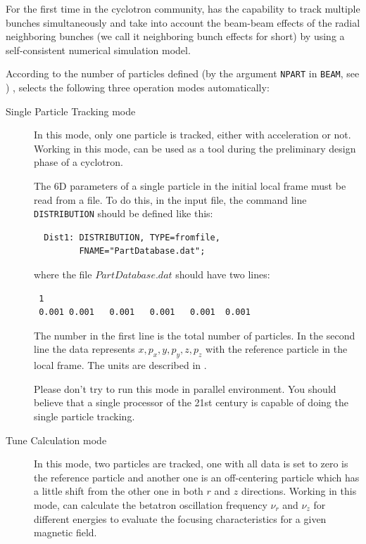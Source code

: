 For the first time in the cyclotron community, \opalcycl has the capability to track multiple bunches simultaneously
and take into account the beam-beam effects of the radial neighboring bunches (we call it neighboring bunch effects for short)
by using a self-consistent numerical simulation model.

According to the number of particles defined (by the argument \texttt{NPART} in \texttt{BEAM}, see ) ,
\opalcycl selects the following three operation modes automatically:

\begin{description}

\item[Single Particle Tracking mode]

  In this mode, only one particle is tracked, either with acceleration or not.  Working in this mode, \opalcycl
  can be used as a tool during the preliminary design phase of a cyclotron.

  The 6D parameters of a single particle in the initial local frame must be read from a file. To do this, in the \opal input file,
  the command line \texttt{DISTRIBUTION}  should be defined like this:
\begin{verbatim}
  Dist1: DISTRIBUTION, TYPE=fromfile,
         FNAME="PartDatabase.dat";
\end{verbatim}
 where the file $PartDatabase.dat$ should have two lines:
\begin{verbatim}
 1
 0.001 0.001   0.001   0.001   0.001  0.001
\end{verbatim}
The number in the first line is the total number of particles.
In the second line the data represents $x, p_x, y,$$ p_y, z, p_z$ with the reference particle
in the local frame. The units are described in .

Please don't try to run this mode in parallel environment. You should believe that a single processor of the 21st century is capable of doing
the single particle tracking.

\item[Tune Calculation mode]

  In this mode, two particles are tracked, one with all data is set to zero is the reference particle and another one is an off-centering particle
  which has a little shift from the other one in both $r$ and $z$ directions. Working in this mode, \opalcycl can
  calculate the betatron oscillation frequency $\nu_r$ and $\nu_z$ for different energies to evaluate the focusing characteristics
  for a given magnetic field.


\end{description}
